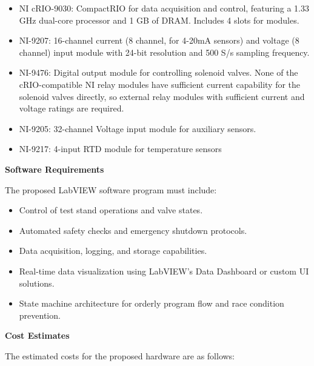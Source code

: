     \begin{itemize}
        \item NI cRIO-9030: CompactRIO for data acquisition and control, featuring a 1.33 GHz dual-core processor and 1 GB of DRAM. Includes 4 slots for modules.
        \item NI-9207: 16-channel current (8 channel, for 4-20mA sensors) and voltage (8 channel) input module with 24-bit resolution and 500 S/s sampling frequency.
        \item NI-9476: Digital output module for controlling solenoid valves. None of the cRIO-compatible NI relay modules have sufficient current capability for the solenoid valves directly, so external relay modules with sufficient current and voltage ratings are required.
        \item NI-9205: 32-channel Voltage input module for auxiliary sensors.
        \item NI-9217: 4-input RTD  module for temperature sensors
    \end{itemize}
    
    \textbf{Software Requirements}
    
    The proposed LabVIEW software program must include:
    
    \begin{itemize}
        \item Control of test stand operations and valve states.
        \item Automated safety checks and emergency shutdown protocols.
        \item Data acquisition, logging, and storage capabilities.
        \item Real-time data visualization using LabVIEW’s Data Dashboard or custom UI solutions.
        \item State machine architecture for orderly program flow and race condition prevention.
    \end{itemize}
    
    \textbf{Cost Estimates}
    
    The estimated costs for the proposed hardware are as follows:
    
